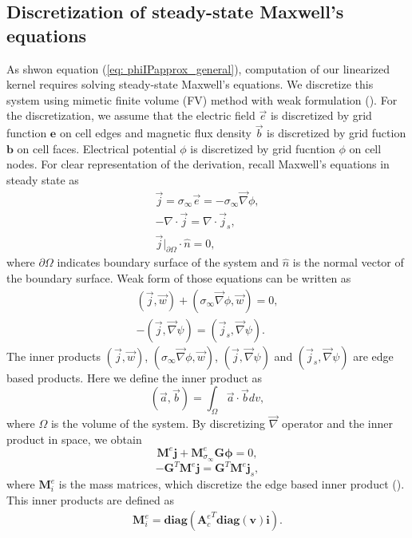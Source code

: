 \documentclass[a4paper, 11pt]{article}
\renewcommand{\div}{\nabla\cdot}
\newcommand{\grad}{\vec \nabla}
\newcommand{\siginf}{\sigma_\infty}
\newcommand{\dgrad}{{\mathbf G}}
\newcommand{\Ace}{{\mathbf A_c^e}}
\newcommand{\diag}{\mathbf{diag}}
\newcommand{\M}{{\mathbf M}}
\newcommand{\MeSigInf}{{\M^e_{\sigma_\infty}}}
\newcommand{\Me}{{\M^e}}
\renewcommand {\j}  { {\vec j} }
\renewcommand {\b}  { {\vec b} }
\newcommand {\e}  { {\vec e} }
\renewcommand {\dj}  { {\mathbf{j} } }
\newcommand {\db}  { {\mathbf{b} } }
\newcommand {\de}  { {\mathbf{e} } }
\newcommand{\vol}{\mathbf{v}}
\begin{document}
\subsection{Discretization of steady-state Maxwell's equations}
\label{section:maxwell_discrete}
As shwon equation (\ref{eq: phiIPapprox_general}), computation of our linearized kernel requires solving steady-state Maxwell's equations. 
We discretize this system using mimetic finite volume (FV) method with weak formulation (\cite{Eldadbook}). 
For the discretization, we assume that the electric field $\e$ is discretized by grid function $\de$ on cell edges and magnetic flux density $\b$ is discretized by grid fuction $\db$ on cell faces. 
Electrical potential $\phi$ is discretized by grid fucntion  $\phi$ on cell nodes. For clear representation of the derivation, recall Maxwell's equations in steady state as
\begin{align}
  \j = \siginf\e = -\siginf\grad \phi, \\
  -\div \j = \div \j_s, \\
  \j\big|_{\partial \Omega}\cdot\hat{n} = 0,
  \label{eq:DCBCneumann}
\end{align}
where $\partial \Omega$ indicates boundary surface of the system and $\hat{n}$ is the normal vector of the boundary surface. Weak form of those equations can be written as
\begin{align}
  (\j, \vec{w}) + (\siginf \grad \phi, \vec{w}) = 0, \\
  -(\j, \grad \psi) = (\j_s, \grad \psi).
\end{align}
The inner products $(\j, \vec{w})$, $(\siginf \grad \phi, \vec{w})$,  $(\j, \grad \psi)$ and $(\j_s, \grad \psi)$ are edge based products. Here we define the inner product as
\begin{equation}
  (\vec{a}, \vec{b}) = \int_{\Omega} \vec{a}\cdot\vec{b} dv,
\end{equation}
where $\Omega$ is the volume of the system. By discretizing $\grad$ operator and the inner product in space, we obtain
\begin{equation}
  \Me\dj + \MeSigInf\dgrad\boldsymbol{\phi} = 0,
  \label{eq:DCdisceq1}
\end{equation}
\begin{equation}
  -\dgrad^T \Me\dj = \dgrad^T \Me\dj_s,
  \label{eq:DCdisceq2}
\end{equation}
where $\mathbf{M}^e_i$ is the mass matrices, which discretize the edge based inner product (\cite{Eldadbook}). This inner products are defined  as
\begin{align}
  \mathbf{M}^e_i = \diag(\Ace^T\diag(\vol)\mathbf{i}).
\end{align}
\end{document}
